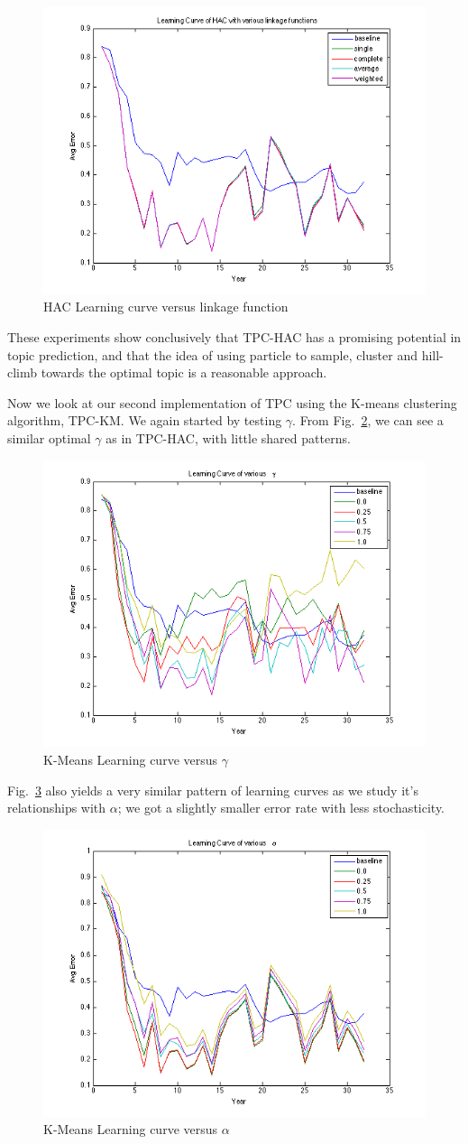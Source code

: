 \documentclass[conference]{IEEEtran}
\begin{document}
\begin{figure}[h]
	\center
	\includegraphics[width=.50\textwidth]{fig/hac_link.png}
	\caption{HAC Learning curve versus linkage function}
	\label{hac_link}
\end{figure}

These experiments show conclusively that TPC-HAC has a promising potential in topic prediction, and that the idea of using particle to sample, cluster and hill-climb towards the optimal topic is a reasonable approach.

Now we look at our second implementation of TPC using the K-means clustering algorithm, TPC-KM. We again started by testing $\gamma$. From Fig.~\ref{kmeans_gamma}, we can see a similar optimal $\gamma$ as in TPC-HAC, with little shared patterns.

\begin{figure}[h]
	\center
	\includegraphics[width=.50\textwidth]{fig/kmeans_gamma.png}
	\caption{K-Means Learning curve versus $\gamma$}
	\label{kmeans_gamma}
\end{figure}

Fig.~\ref{kmeans_alpha} also yields a very similar pattern of learning curves as we study it's relationships with $\alpha$; we got a slightly smaller error rate with less stochasticity.
%

\begin{figure}[h]
	\center
	\includegraphics[width=.50\textwidth]{fig/kmeans_alpha.png}
	\caption{K-Means Learning curve versus $\alpha$}
	\label{kmeans_alpha}
\end{figure}
\end{document}
